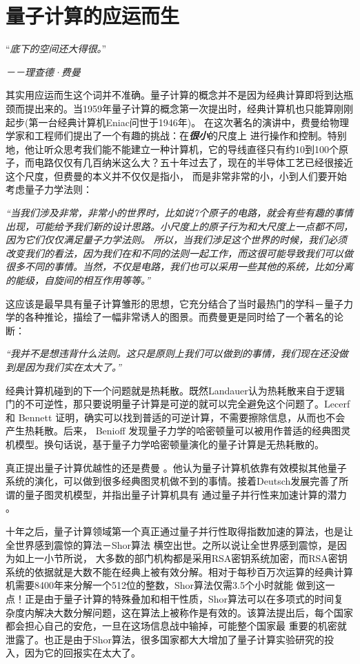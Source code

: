     \section{量子计算的应运而生}

    “\emph{底下的空间还大得很。}”

 \hspace{23em} \emph{－－理查德·费曼}

其实用应运而生这个词并不准确。量子计算的概念并不是因为经典计算即将到达瓶颈而提出来的。当1959年量子计算的概念第一次提出时\cite{Feynman}，经典计算机也只能算刚刚起步(第一台经典计算机Eniac问世于1946年)。
在这次著名的演讲中，费曼给物理学家和工程师们提出了一个有趣的挑战：在\emph{\textbf{很小}}的尺度上
进行操作和控制。特别地，他让听众思考我们能不能建立一种计算机，它的导线直径只有约10到100个原子，而电路仅仅有几百纳米这么大？五十年过去了，现在的半导体工艺已经很接近这个尺度，但费曼的本义并不仅仅是指小，
而是非常非常的小，小到人们要开始考虑量子力学法则：

\emph{“当我们涉及非常，非常小的世界时，比如说7个原子的电路，就会有些有趣的事情出现，可能给予我们新的设计思路。小尺度上的原子行为和大尺度上一点都不同，因为它们仅仅满足量子力学法则。
所以，当我们涉足这个世界的时候，我们必须改变我们的看法，因为我们在和不同的法则一起工作，而这很可能导致我们可以做很多不同的事情。当然，不仅是电路，我们也可以采用一些其他的系统，比如分离的能级，自旋间的相互作用等等。”}

这应该是最早具有量子计算雏形的思想，它充分结合了当时最热门的学科－量子力学的各种推论，描绘了一幅非常诱人的图景。而费曼更是同时给了一个著名的论断：

\emph{“我并不是想违背什么法则。这只是原则上我们可以做到的事情，我们现在还没做到是因为我们实在太大了。”}

经典计算机碰到的下一个问题就是热耗散。既然Landauer认为热耗散来自于逻辑门的不可逆性，那只要说明量子计算是可逆的就可以完全避免这个问题了。Lecerf \cite{Lecerf} 和 Bennett \cite{Bennett}证明，确实可以找到普适的可逆计算，不需要擦除信息，从而也不会产生热耗散。后来， Benioff \cite{Benioff} 发现量子力学的哈密顿量可以被用作普适的经典图灵机模型。换句话说，基于量子力学哈密顿量演化的量子计算是无热耗散的。

真正提出量子计算优越性的还是费曼 \cite{Feynman2,Feynman3}。他认为量子计算机依靠有效模拟其他量子系统的演化，可以做到很多经典图灵机做不到的事情。接着Deutsch发展完善了所谓的量子图灵机模型，并指出量子计算机具有
通过量子并行性来加速计算的潜力 \cite{Deutsch}。

十年之后，量子计算领域第一个真正通过量子并行性取得指数加速的算法，也是让全世界感到震惊的算法－Shor算法 \cite{Shor} 横空出世。之所以说让全世界感到震惊，是因为如上一小节所说，
大多数的部门机构都是采用RSA密钥系统加密，而RSA密钥系统的依据就是大数不能在经典上被有效分解。相对于每秒百万次运算的经典计算机需要8400年来分解一个512位的整数，Shor算法仅需3.5个小时就能
做到这一点！正是由于量子计算的特殊叠加和相干性质，Shor算法可以在多项式的时间复杂度内解决大数分解问题，这在算法上被称作是有效的。该算法提出后，每个国家都会担心自己的安危，一旦在这场信息战中输掉，可能整个国家最
重要的机密就泄露了。也正是由于Shor算法，很多国家都大大增加了量子计算实验研究的投入，因为它的回报实在太大了。

